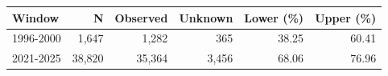 \begin{tabular}{@{}lrrrrr@{}}
\toprule
Window & N & Observed & Unknown & Lower (\%) & Upper (\%) \\
\midrule
1996-2000 & 1,647 & 1,282 & 365 & 38.25 & 60.41 \\
2021-2025 & 38,820 & 35,364 & 3,456 & 68.06 & 76.96 \\
\bottomrule
\end{tabular}
